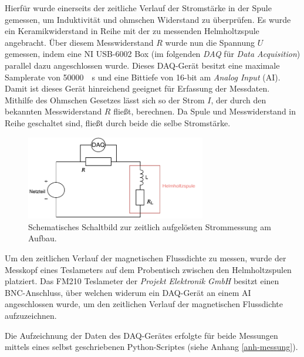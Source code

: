 \documentclass[page,pdftex,12pt,a4paper,twoside,openright]{scrbook}
\begin{document}
Hierfür wurde einerseits der zeitliche Verlauf der Stromstärke in der Spule gemessen, um Induktivität und ohmschen Widerstand zu überprüfen. Es wurde ein Keramikwiderstand in Reihe mit der zu messenden Helmholtzspule angebracht. Über diesem Messwiderstand \(R\) wurde nun die Spannung \(U\) gemessen, indem eine NI USB-6002 Box (im folgenden \emph{DAQ} für \emph{Data Acquisition}) parallel dazu angeschlossen wurde. Dieses DAQ-Gerät besitzt eine maximale Samplerate von \SI{50000}{\per\s} und eine Bittiefe von 16-bit am \emph{Analog Input} (AI). Damit ist dieses Gerät hinreichend geeignet für Erfassung der Messdaten. Mithilfe des Ohmschen Gesetzes lässt sich so der Strom \(I\), der durch den bekannten Messwiderstand \(R\) fließt, berechnen. Da Spule und Messwiderstand in Reihe geschaltet sind, fließt durch beide die selbe Stromstärke.

\begin{figure}[h]
\centering
\includegraphics[width=0.7\textwidth]{img/strommessung.pdf}
\caption{\label{fig-strommessung-aufbau}
Schematisches Schaltbild zur zeitlich aufgelösten Strommessung am Aufbau.}
\end{figure}

Um den zeitlichen Verlauf der magnetischen Flussdichte zu messen, wurde der Messkopf eines Teslameters auf dem Probentisch zwischen den Helmholtzspulen platziert. Das FM210 Teslameter der \emph{Projekt Elektronik GmbH} besitzt einen BNC-Anschluss, über welchen widerum ein DAQ-Gerät an einem AI angeschlossen wurde, um den zeitlichen Verlauf der magnetischen Flussdichte aufzuzeichnen.

Die Aufzeichnung der Daten des DAQ-Gerätes erfolgte für beide Messungen mittels eines selbst geschriebenen Python-Scriptes (siehe Anhang \ref{anh-messung}).
\end{document}
